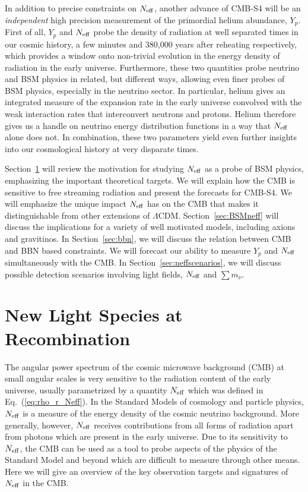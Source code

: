 In addition to precise constraints on $N_{\rm eff}$, another advance of CMB-S4 will be an {\it independent} high precision measurement of the primordial helium abundance, $Y_p$. First of all, $Y_p$ and $N_{\rm eff}$ probe the density of radiation at well separated times in our cosmic history, a few minutes and 380,000 years after reheating respectively, which provides a window onto non-trivial evolution in the energy density of radiation in the early universe.  Furthermore, these two quantities probe neutrino and BSM physics in related, but different ways, allowing even finer probes of BSM physics, especially in the neutrino sector.  In particular, helium gives an integrated measure of the expansion rate in the early universe convolved with the weak interaction rates that interconvert neutrons and protons. Helium therefore gives us a handle on neutrino energy distribution functions in a way that $N_{\rm eff}$ alone does not.  In combination, these two parameters yield even further insights into our cosmological history at very disparate times.  

Section~\ref{sec:Neff} will review the motivation for studying $N_{\rm eff}$ as a probe of BSM physics, emphasizing the important theoretical targets.  We will explain how the CMB is sensitive to free streaming radiation and present the forecasts for CMB-S4.  We will emphasize the unique impact $N_{\rm eff}$ has on the CMB that makes it distinguishable from other extensions of $\Lambda$CDM.   Section~\ref{sec:BSMneff} will discuss the implications for a variety of well motivated models, including axions and gravitinos.  In Section~\ref{sec:bbn}, we will discuss the relation between CMB and BBN based constraints.  We will forecast our ability to measure $Y_p$ and $N_{\rm eff}$ simultaneously with the CMB.  In Section~\ref{sec:neffscenarios}, we will discuss possible detection scenarios involving light fields, $N_{\rm eff}$ and $\sum m_\nu$.


\section{New Light Species at Recombination}\label{sec:Neff}


The angular power spectrum of the cosmic microwave background (CMB) at small angular scales is very sensitive to the radiation content of the early universe, usually parametrized by a quantity $N_{\rm eff}$ which was defined in Eq.~(\ref{eq:rho_r_Neff}).  In the Standard Models of cosmology and particle physics, $N_{\rm eff}$ is a measure of the energy density of the cosmic neutrino background.  More generally, however, $N_{\rm eff}$ receives contributions from all forms of radiation apart from photons which are present in the early universe.  Due to its sensitivity to $N_{\rm eff}$, the CMB can be used as a tool to probe aspects of the physics of the Standard Model and beyond which are difficult to measure through other means.  Here we will give an overview of the key observation targets and signatures of $N_{\rm eff}$ in the CMB.  







